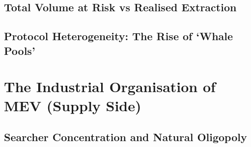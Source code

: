 \documentclass[pdflatex, sn-basic]{sn-jnl}
\theoremstyle{thmstylethree}%
\begin{document}
    \FloatBarrier

	\subsection{Total Volume at Risk vs Realised Extraction}
	\label{subsec:volume-vs-extraction}



	\subsection{Protocol Heterogeneity: The Rise of `Whale Pools'}
	\label{subsec:protocol-heterogeneity}


	\section{The Industrial Organisation of MEV (Supply Side)}
	\label{sec:supply-side-io}

	\subsection{Searcher Concentration and Natural Oligopoly}
	\label{subsec:searcher-concentration}

\end{document}
